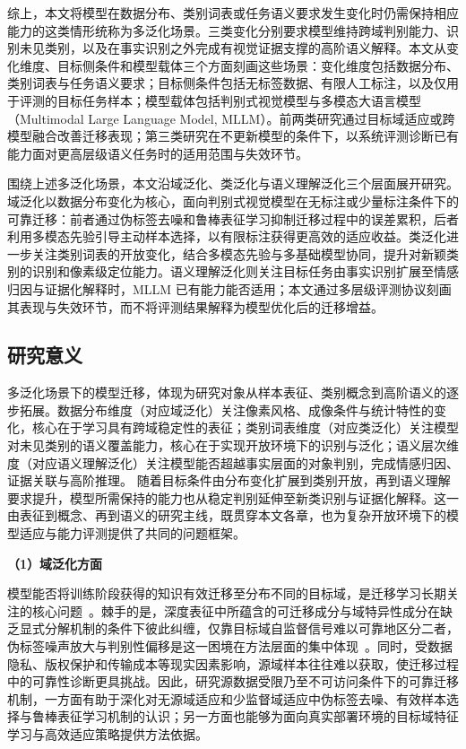 综上，本文将模型在数据分布、类别词表或任务语义要求发生变化时仍需保持相应能力的这类情形统称为多泛化场景。三类变化分别要求模型维持跨域判别能力、识别未见类别，以及在事实识别之外完成有视觉证据支撑的高阶语义解释。本文从变化维度、目标侧条件和模型载体三个方面刻画这些场景：变化维度包括数据分布、类别词表与任务语义要求；目标侧条件包括无标签数据、有限人工标注，以及仅用于评测的目标任务样本；模型载体包括判别式视觉模型与多模态大语言模型（Multimodal Large Language Model, MLLM）。前两类研究通过目标域适应或跨模型融合改善迁移表现；第三类研究在不更新模型的条件下，以系统评测诊断已有能力面对更高层级语义任务时的适用范围与失效环节。

围绕上述多泛化场景，本文沿域泛化、类泛化与语义理解泛化三个层面展开研究。域泛化以数据分布变化为核心，面向判别式视觉模型在无标注或少量标注条件下的可靠迁移：前者通过伪标签去噪和鲁棒表征学习抑制迁移过程中的误差累积，后者利用多模态先验引导主动样本选择，以有限标注获得更高效的适应收益。类泛化进一步关注类别词表的开放变化，结合多模态先验与多基础模型协同，提升对新颖类别的识别和像素级定位能力。语义理解泛化则关注目标任务由事实识别扩展至情感归因与证据化解释时，MLLM 已有能力能否适用；本文通过多层级评测协议刻画其表现与失效环节，而不将评测结果解释为模型优化后的迁移增益。


\subsection{研究意义}
多泛化场景下的模型迁移，体现为研究对象从样本表征、类别概念到高阶语义的逐步拓展。数据分布维度（对应域泛化）关注像素风格、成像条件与统计特性的变化，核心在于学习具有跨域稳定性的表征；类别词表维度（对应类泛化）关注模型对未见类别的语义覆盖能力，核心在于实现开放环境下的识别与泛化；语义层次维度（对应语义理解泛化）关注模型能否超越事实层面的对象判别，完成情感归因、证据关联与高阶推理。
随着目标条件由分布变化扩展到类别开放，再到语义理解要求提升，模型所需保持的能力也从稳定判别延伸至新类识别与证据化解释。这一由表征到概念、再到语义的研究主线，既贯穿本文各章，也为复杂开放环境下的模型适应与能力评测提供了共同的问题框架。

\noindent\textbf{（1）域泛化方面} 

模型能否将训练阶段获得的知识有效迁移至分布不同的目标域，是迁移学习长期关注的核心问题~\cite{liang2021source,ganin2016domain,long2015learning}。棘手的是，深度表征中所蕴含的可迁移成分与域特异性成分在缺乏显式分解机制的条件下彼此纠缠，仅靠目标域自监督信号难以可靠地区分二者，伪标签噪声放大与判别性偏移是这一困境在方法层面的集中体现~\cite{yang2021neighbor,kundu2022towards}。同时，受数据隐私、版权保护和传输成本等现实因素影响，源域样本往往难以获取，使迁移过程中的可靠性诊断更具挑战。因此，研究源数据受限乃至不可访问条件下的可靠迁移机制，一方面有助于深化对无源域适应和少监督域适应中伪标签去噪、有效样本选择与鲁棒表征学习机制的认识；另一方面也能够为面向真实部署环境的目标域特征学习与高效适应策略提供方法依据。

